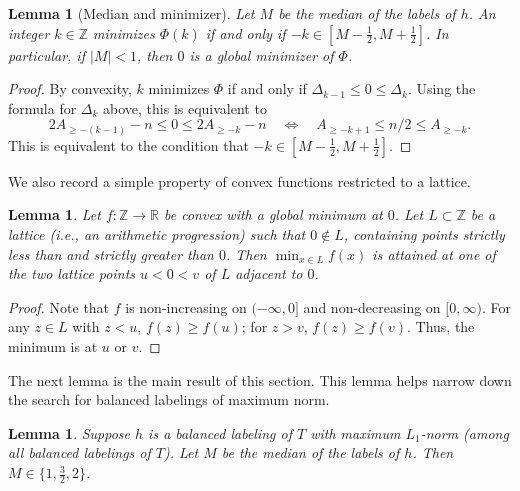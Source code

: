 \documentclass[12pt,reqno]{amsart}
\newtheorem{lem}[thm]{Lemma}
\theoremstyle{definition}
\newcommand{\R}{\mathbb{R}}
\newcommand{\Z}{\mathbb{Z}}
\begin{document}
\begin{lem}[Median and minimizer]
\label{lem:minimizer}
Let $M$ be the median of the labels of $h$. An integer $k \in \Z$ minimizes $\Phi(k)$ if and only if $-k\in [M-\frac{1}{2}, M+\frac{1}{2}]$. In particular, if $|M| < 1$, then $0$ is a global minimizer of $\Phi$.
\end{lem}

\begin{proof}
By convexity, $k$ minimizes $\Phi$ if and only if $\Delta_{k-1} \le 0 \le \Delta_k$. Using the formula for $\Delta_k$ above, this is equivalent to
\[
2A_{\ge -(k-1)} - n \le 0 \le 2A_{\ge -k} - n \quad \iff \quad A_{\ge -k+1} \le n/2 \le A_{\ge -k}.
\]
This is equivalent to the condition that $-k\in \left[M-\frac{1}{2}, M+\frac{1}{2}\right]$. \end{proof}

We also record a simple property of convex functions restricted to a lattice.

\begin{lem}
\label{lem:lattice}
Let $f\colon \Z \to \R$ be convex with a global minimum at $0$. Let $L \subset \Z$ be a lattice (i.e., an arithmetic progression) such that $0 \notin L$, containing points strictly less than and strictly greater than $0$. Then $\min_{x \in L} f(x)$ is attained at one of the two lattice points $u < 0 < v$ of $L$ adjacent to $0$.
\end{lem}

\begin{proof}
Note that $f$ is non-increasing on $(-\infty, 0]$ and non-decreasing on $[0, \infty)$. For any $z \in L$ with $z < u$, $f(z) \ge f(u)$; for $z > v$, $f(z) \ge f(v)$. Thus, the minimum is at $u$ or $v$.
\end{proof}

The next lemma is the main result of this section. This lemma helps narrow down the search for balanced labelings of maximum norm.

\begin{lem}\label{lem:median-control}
Suppose $h$ is a balanced labeling of $T$ with maximum $L_1$-norm (among all balanced labelings of $T$). Let $M$ be the median of the labels of $h$. Then $M\in \{1, \frac{3}{2}, 2\}$.
\end{lem}
\end{document}
